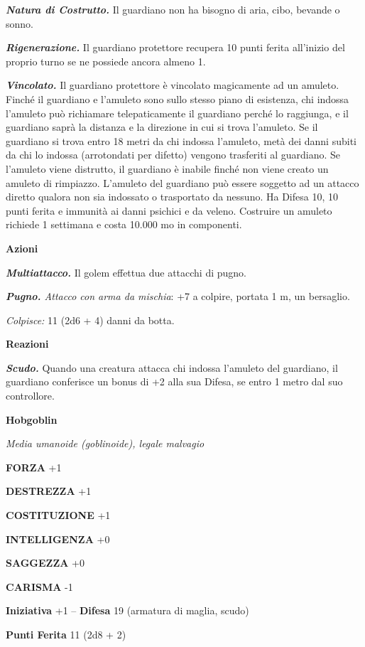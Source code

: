 \begin{multicols}{2}
\emph{\textbf{Natura di Costrutto.}} Il guardiano non ha bisogno di aria, cibo, bevande o sonno.

\emph{\textbf{Rigenerazione.}} Il guardiano protettore recupera 10 punti ferita all'inizio del proprio turno se ne possiede ancora almeno 1.

\emph{\textbf{Vincolato.}} Il guardiano protettore è vincolato magicamente ad un amuleto. Finché il guardiano e l'amuleto sono sullo stesso piano di esistenza, chi indossa l'amuleto può richiamare telepaticamente il guardiano perché lo raggiunga, e il guardiano saprà la distanza e la direzione in cui si trova l'amuleto. Se il guardiano si trova entro 18 metri da chi indossa l'amuleto, metà dei danni subiti da chi lo indossa (arrotondati per difetto) vengono trasferiti al guardiano. Se l'amuleto viene distrutto, il guardiano è inabile finché non viene creato un amuleto di rimpiazzo. L'amuleto del guardiano può essere soggetto ad un attacco diretto qualora non sia indossato o trasportato da nessuno. Ha Difesa 10, 10 punti ferita e immunità ai danni psichici e da veleno. Costruire un amuleto richiede 1 settimana e costa 10.000 mo in componenti.

\textbf{Azioni}

\emph{\textbf{Multiattacco.}} Il golem effettua due attacchi di pugno.

\emph{\textbf{Pugno.} Attacco con arma da mischia}: +7 a colpire,
portata 1 m, un bersaglio.

\emph{Colpisce:} 11 (2d6 + 4) danni da botta.

\textbf{Reazioni}

\emph{\textbf{Scudo.}} Quando una creatura attacca chi indossa l'amuleto del guardiano, il guardiano conferisce un bonus di +2 alla sua Difesa, se entro 1 metro dal suo controllore.

\medskip{}\textbf{Hobgoblin}

\emph{Media umanoide (goblinoide), legale malvagio}

\textbf{FORZA} +1

\textbf{DESTREZZA} +1

\textbf{COSTITUZIONE} +1

\textbf{INTELLIGENZA} +0

\textbf{SAGGEZZA} +0

\textbf{CARISMA} -1

\textbf{Iniziativa} +1 -- \textbf{Difesa} 19 (armatura di maglia, scudo)

\textbf{Punti Ferita} 11 (2d8 + 2)


\end{multicols}
